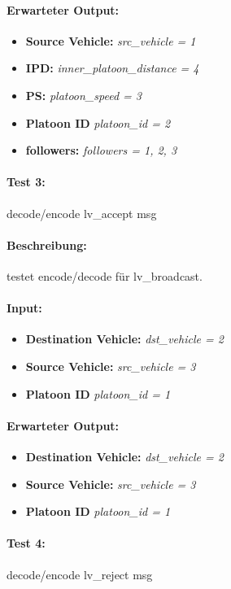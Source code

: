 \documentclass[a4paper, 12pt, titlepage]{scrartcl}
\begin{document}
{			\paragraph{Erwarteter Output:}
			\begin{itemize} \itemsep-0.5em
				\item \textbf{Source Vehicle:} \emph{src\_vehicle = 1}
				\item \textbf{IPD:} \emph{inner\_platoon\_distance = 4}
				\item \textbf{PS:} \emph{platoon\_speed = 3}
				\item \textbf{Platoon ID} \emph{platoon\_id = 2}
				\item \textbf{followers:} \emph{followers = {1, 2, 3}}
			\end{itemize}

			\paragraph{Test 3:}{decode/encode lv\_accept msg}
			\paragraph{Beschreibung:} testet encode/decode für lv\_broadcast.
			\paragraph{Input:}
			\begin{itemize} \itemsep-0.5em
				\item \textbf{Destination Vehicle:} \emph{dst\_vehicle = 2}
				\item \textbf{Source Vehicle:} \emph{src\_vehicle = 3}
				\item \textbf{Platoon ID} \emph{platoon\_id = 1}
			\end{itemize}
			\paragraph{Erwarteter Output:}
			\begin{itemize} \itemsep-0.5em
				\item \textbf{Destination Vehicle:} \emph{dst\_vehicle = 2}
				\item \textbf{Source Vehicle:} \emph{src\_vehicle = 3}
				\item \textbf{Platoon ID} \emph{platoon\_id = 1}
			\end{itemize}
			
			\paragraph{Test 4:}{decode/encode lv\_reject msg}
}
\end{document}
